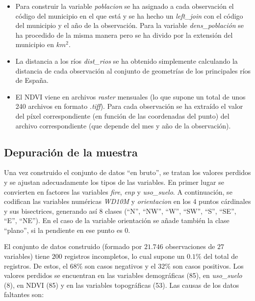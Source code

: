 \documentclass[12pt,a4paper,]{book}
\numberwithin{dummy}{section}
\theoremstyle{ocrenumbox}
\theoremstyle{blacknumex}
\theoremstyle{blacknumbox}
\theoremstyle{ocrenum}
\theoremstyle{ocrenum}
\begin{document}
\begin{itemize}
\item
  Para construir la variable \emph{poblacion} se ha asignado a cada
  observación el código del municipio en el que está y se ha hecho un
  \emph{left\_join} con el código del municipio y el año de la
  observación. Para la variable \emph{dens\_población} se ha procedido
  de la misma manera pero se ha divido por la extensión del municipio en
  \(km^2\).
\item
  La distancia a los ríos \emph{dist\_rios} se ha obtenido simplemente
  calculando la distancia de cada observación al conjunto de geometrías
  de los principales ríos de España.
\item
  El NDVI viene en archivos \emph{raster} mensuales (lo que supone un
  total de unos 240 archivos en formato \emph{.tiff}). Para cada
  observación se ha extraído el valor del píxel correspondiente (en
  función de las coordenadas del punto) del archivo correspondiente (que
  depende del mes y año de la observación).
\end{itemize}

\hypertarget{depuraciuxf3n-de-la-muestra}{%
\subsection{Depuración de la
muestra}\label{depuraciuxf3n-de-la-muestra}}

Una vez construido el conjunto de datos ``en bruto'', se tratan los
valores perdidos y se ajustan adecuadamente los tipos de las variables.
En primer lugar se convierten en factores las variables \emph{fire},
\emph{enp} y \emph{uso\_suelo}. A continuación, se codifican las
variables numéricas \emph{WD10M} y \emph{orientacion} en los 4 puntos
cárdinales y sus bisectrices, generando así 8 clases (``N'', ``NW'',
``W'', ``SW'', ``S'', ``SE'', ``E'', ``NE''). En el caso de la variable
orientación se añade también la clase ``plano'', si la pendiente en ese
punto es 0.

El conjunto de datos construido (formado por \(21.746\) observaciones de
\(27\) variables) tiene \(200\) registros incompletos, lo cual supone un
\(0.1\%\) del total de registros. De estos, el \(68\%\) son casos
negativos y el \(32\%\) son casos positivos. Los valores perdidos se
encuentran en las variables demográficas (85), en \emph{uso\_suelo} (8),
en NDVI (85) y en las variables topográficas (53). Las causas de los
datos faltantes son:
\end{document}
